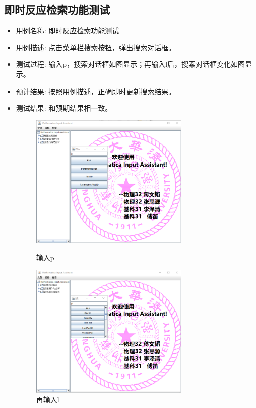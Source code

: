 \documentclass[hyperref, UTF8
,bookmarksnumbered=true, oneside]{ctexbook}
\begin{document}
		\subsection{即时反应检索功能测试} %
		\begin{itemize}
			\item 用例名称: 即时反应检索功能测试
			\item 用例描述: 点击菜单栏搜索按钮，弹出搜索对话框。
			\item 测试过程: 输入p，搜索对话框如图显示；再输入l后，搜索对话框变化如图显示。
			\item 预计结果: 按照用例描述，正确即时更新搜索结果。
			\item 测试结果:	和预期结果相一致。

				\begin{figure}[!h]
	                \begin{minipage}[b]{0.45\textwidth}
	                \centering
	                \includegraphics[width=3in]{18.png}
	                \caption{输入p}
	                \label{pic:MathPack}
	                \end{minipage}%
	                \hspace{0.1\textwidth}%
	                \begin{minipage}[b]{0.45\textwidth}
	                \centering
	                \includegraphics[width=3in]{19.png}
	                \caption{再输入l}
	                \label{pic:GUIPack}
	                \end{minipage}
            	\end{figure}

		\end{itemize}
		
\end{document}
